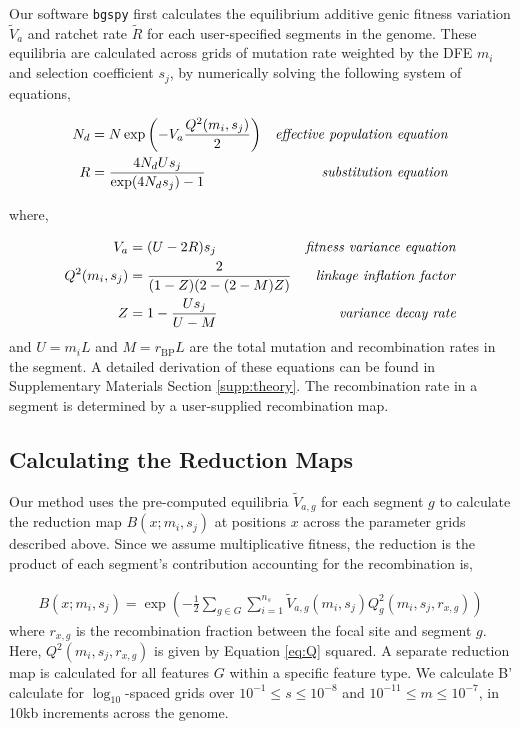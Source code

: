 \documentclass[11pt]{article}
\begin{document}
Our software \texttt{bgspy} first calculates the equilibrium additive genic
fitness variation $\widetilde{V}_a$ and ratchet rate $\widetilde{R}$ for each
user-specified segments in the genome. These equilibria are calculated across
grids of mutation rate weighted by the DFE $m_i$ and selection coefficient
$s_j$, by numerically solving the following system of equations,

\begin{align}
  \label{eq:method-2eqns}
  {N}_{d} &= N \exp \left( -V_a \frac{Q^2(m_i, s_j)}{2} \right) & \text{\emph{effective population equation}} \\
  R &= \frac{4N_dU s_j}{\exp(4 N_d s_j)-1}  & \text{\emph{substitution equation}} 
\end{align}

where,

\begin{align}
  V_a &= (U - 2 R) s_j & \text{\emph{fitness variance equation}} \\
  Q^2(m_i, s_j) &= \frac{2}{(1-Z)(2-(2-M)Z)} & \text{\emph{linkage inflation factor}} \\
  Z &= 1 - \frac{Us_j}{U-{M}} & \text{\emph{variance decay rate}}
\end{align}
%
and $U = m_i L$ and $M = r_\text{BP} L$ are the total mutation and
recombination rates in the segment. A detailed derivation of these equations
can be found in Supplementary Materials Section \ref{supp:theory}. The recombination
rate in a segment is determined by a user-supplied recombination map.

\subsection*{Calculating the Reduction Maps}
\label{sec:methods-maps}

Our method uses the pre-computed equilibria $\widetilde{V}_{a,g}$ for each
segment $g$ to calculate the reduction map $B(x; m_i, s_j)$ at positions $x$
across the parameter grids described above. Since we assume multiplicative
fitness, the reduction is the product of each segment's contribution accounting
for the recombination is,

\begin{align}
    B(x; m_i, s_j) = \exp\left(- \frac{1}{2}\sum_{g \in G} \sum_{i=1}^{n_s} \widetilde{V}_{a,g}(m_i, s_j) Q_g^2(m_i, s_j, r_{x, g})\right)
\end{align}
%
where $r_{x, g}$ is the recombination fraction between the focal site and
segment $g$. Here, $Q^2(m_i, s_j, r_{x,g})$ is given by Equation \eqref{eq:Q}
squared. A separate reduction map is calculated for all features $G$ within a
specific feature type. We calculate B' calculate for $\log_{10}$-spaced grids
over $10^{-1} \le s \le 10^{-8}$ and $10^{-11} \le m \le 10^{-7}$, in 10kb
increments across the genome.
\end{document}

